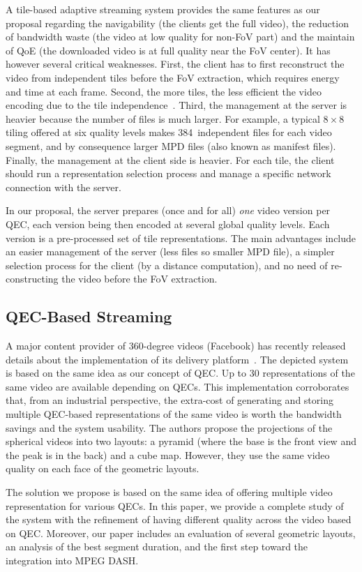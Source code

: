 A tile-based adaptive streaming
system provides the same features as our proposal regarding the navigability (the clients
get the full video), the reduction of bandwidth
waste (the video at low quality for non-\ac{FoV} part) and the maintain of \ac{QoE} (the downloaded video is at full quality near the
FoV center). It has however several critical weaknesses. First, the client has to first reconstruct
the video from independent tiles before the FoV extraction, which requires energy and
time at each frame. Second, the more tiles, the less efficient the video encoding due to the
tile independence~\cite{sanchez_compressed_2015}. Third, the management at the server is
heavier because the number of files
is much larger. For example, a typical $8\times8$ tiling offered at six quality levels makes
384~independent files for each video segment, and by consequence larger \ac{MPD} files (also known as
manifest files).
Finally, the management at the client side is heavier. For each tile, the client should run
a representation selection process
and manage a specific network connection with the server.

 In our proposal, the server prepares (once and for
all) \emph{one} video version per
\ac{QEC}, each version being then encoded at several global quality levels. Each version
is a pre-processed set of tile representations. The main advantages include an easier
management of the server
(less files so smaller \ac{MPD} file), a simpler selection process for the client (by
a distance computation), and no need of re-constructing the video before the \ac{FoV} extraction.

\subsection{QEC-Based Streaming}

A major content provider of 360-degree videos (Facebook) has recently
released details about the
implementation of its delivery platform~\cite{facebook}. The depicted system is based
on the same idea as our concept of \ac{QEC}. Up to 30 representations of the same video
are available depending on
\acp{QEC}. This implementation corroborates that, from an industrial perspective, the
extra-cost of
generating and storing multiple \ac{QEC}-based representations of the same video
is worth the bandwidth
savings and the system usability. The authors propose the projections of the spherical videos into two layouts: a pyramid (where the
base is the front
view and the peak is in the back) and a cube map. However, they use the same video quality
on each face of the geometric layouts.

The
solution we propose is based on the same idea of offering multiple video representation
for various \acp{QEC}.
In this paper, we provide a complete study of
the system with the refinement of having different quality across the video based on \ac{QEC}.
Moreover, our
paper includes an evaluation of several geometric layouts, an analysis of the best segment
duration, and the first step toward the integration into MPEG \ac{DASH}. 